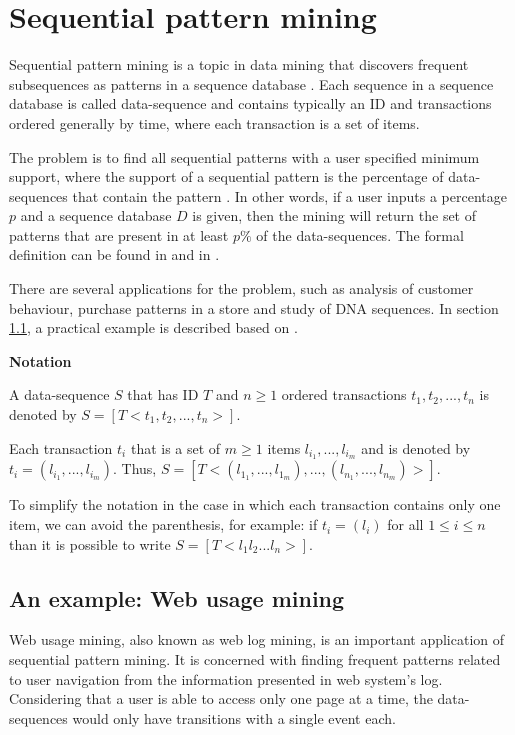 \section{Sequential pattern mining}
\label{sec-seqmining}

Sequential pattern mining is a topic in data mining that discovers frequent subsequences as patterns in a sequence
database \cite{Nizar}. Each sequence in a sequence database is called data-sequence and contains typically an ID and transactions ordered generally by time, where each transaction is a set of items.

The problem is to find all sequential patterns with a user specified minimum support, where the support of a sequential pattern is the percentage of data-sequences that contain the pattern \cite{Rakesh}. In other words, if a user inputs a percentage $p$ and a sequence database $D$ is given, then the mining will return the set of patterns that are present in at least $p\%$ of the data-sequences. The formal definition can be found in \cite{Nizar} and in \cite{Pei}.

There are several applications for the problem, such as analysis of customer behaviour, purchase patterns in a store and study of DNA sequences. In section \ref{webusage}, a practical example is described based on \cite{Nizar}.

\textbf{Notation}

A data-sequence $S$ that has ID $T$ and $n \geq 1$ ordered transactions $t_1,t_2,...,t_n$ is denoted by $S = [T <t_1,t_2,...,t_n>]$. 

Each transaction $t_i$ that is a set of $m \geq 1$ items $l_{i_1},...,l_{i_m}$ and is denoted by $t_i = (l_{i_1},...,l_{i_m})$. Thus, $S = [T <(l_{1_1},...,l_{1_m}), ... ,(l_{n_1},...,l_{n_m})>]$. 

To simplify the notation in the case in which each transaction contains only one item, we can avoid the parenthesis, for example: if $t_i = (l_i)$ for all $ 1 \leq i \leq n$ than it is possible to write $S = [T <l_1l_2...l_n>]$.


\subsection{An example: Web usage mining}
\label{webusage}

Web usage mining, also known as web log mining, is an important application of sequential pattern mining. It is concerned with finding frequent patterns related to user navigation from the information presented in web system's log. Considering that a user is able to access only one page at a time, the data-sequences would only have transitions with a single event each.

